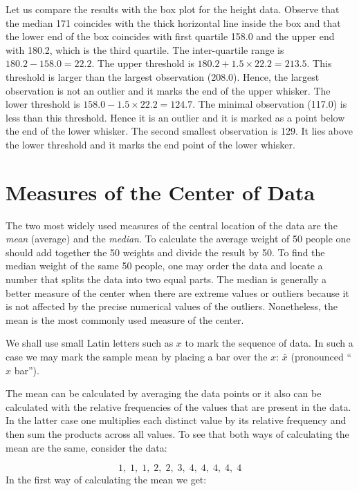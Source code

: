 \documentclass[]{krantz}
\theoremstyle{definition}
\theoremstyle{definition}
\theoremstyle{definition}
\theoremstyle{remark}
\begin{document}
Let us compare the results with the box plot for the height data.
Observe that the median 171 coincides with the thick horizontal line
inside the box and that the lower end of the box coincides with first
quartile 158.0 and the upper end with 180.2, which is the third
quartile. The inter-quartile range is \(180.2 - 158.0 = 22.2\). The
upper threshold is \(180.2 + 1.5 \times 22.2 = 213.5\). This threshold
is larger than the largest observation (208.0). Hence, the largest
observation is not an outlier and it marks the end of the upper whisker.
The lower threshold is \(158.0 - 1.5 \times 22.2 = 124.7\). The minimal
observation (117.0) is less than this threshold. Hence it is an outlier
and it is marked as a point below the end of the lower whisker. The
second smallest observation is 129. It lies above the lower threshold
and it marks the end point of the lower whisker.

\section{Measures of the Center of
Data}\label{measures-of-the-center-of-data}

The two most widely used measures of the central location of the data
are the \emph{mean} (average) and the \emph{median}. To calculate the
average weight of 50 people one should add together the 50 weights and
divide the result by 50. To find the median weight of the same 50
people, one may order the data and locate a number that splits the data
into two equal parts. The median is generally a better measure of the
center when there are extreme values or outliers because it is not
affected by the precise numerical values of the outliers. Nonetheless,
the mean is the most commonly used measure of the center.

We shall use small Latin letters such as \(x\) to mark the sequence of
data. In such a case we may mark the sample mean by placing a bar over
the \(x\): \(\bar x\) (pronounced ``\(x\) bar'').

The mean can be calculated by averaging the data points or it also can
be calculated with the relative frequencies of the values that are
present in the data. In the latter case one multiplies each distinct
value by its relative frequency and then sum the products across all
values. To see that both ways of calculating the mean are the same,
consider the data:

\[1,\; 1,\; 1,\; 2,\; 2,\; 3,\; 4,\; 4,\; 4,\; 4,\; 4\] In the first way
of calculating the mean we get:
\end{document}
